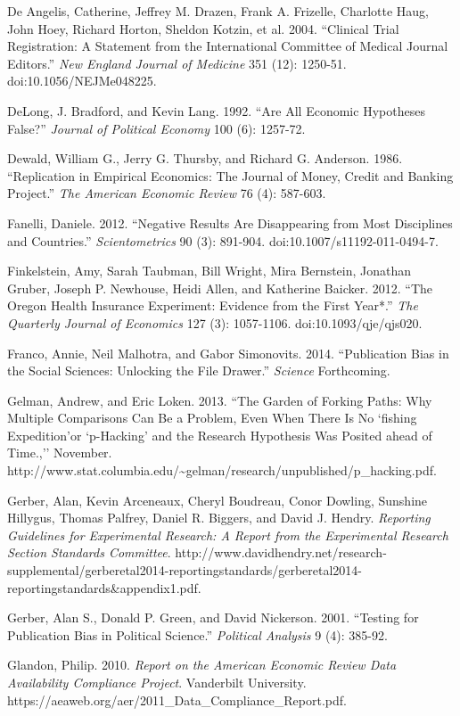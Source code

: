 \documentclass[12pt] {article}
\begin{document}
De Angelis, Catherine, Jeffrey M. Drazen, Frank A. Frizelle, Charlotte
Haug, John Hoey, Richard Horton, Sheldon Kotzin, et al. 2004. ``Clinical
Trial Registration: A Statement from the International Committee of
Medical Journal Editors.'' \emph{New England Journal of Medicine} 351
(12): 1250-51. doi:10.1056/NEJMe048225.

DeLong, J. Bradford, and Kevin Lang. 1992. ``Are All Economic Hypotheses
False?'' \emph{Journal of Political Economy} 100 (6): 1257-72.

Dewald, William G., Jerry G. Thursby, and Richard G. Anderson. 1986.
``Replication in Empirical Economics: The Journal of Money, Credit and
Banking Project.'' \emph{The American Economic Review} 76 (4): 587-603.

Fanelli, Daniele. 2012. ``Negative Results Are Disappearing from Most
Disciplines and Countries.'' \emph{Scientometrics} 90 (3): 891-904.
doi:10.1007/s11192-011-0494-7.

Finkelstein, Amy, Sarah Taubman, Bill Wright, Mira Bernstein, Jonathan
Gruber, Joseph P. Newhouse, Heidi Allen, and Katherine Baicker. 2012.
``The Oregon Health Insurance Experiment: Evidence from the First
Year*.'' \emph{The Quarterly Journal of Economics} 127 (3): 1057-1106.
doi:10.1093/qje/qjs020.

Franco, Annie, Neil Malhotra, and Gabor Simonovits. 2014. ``Publication
Bias in the Social Sciences: Unlocking the File Drawer.'' \emph{Science}
Forthcoming.

Gelman, Andrew, and Eric Loken. 2013. ``The Garden of Forking Paths: Why
Multiple Comparisons Can Be a Problem, Even When There Is No `fishing
Expedition'or `p-Hacking' and the Research Hypothesis Was Posited ahead
of Time.,'' November.
http://www.stat.columbia.edu/\textasciitilde{}gelman/research/unpublished/p\_hacking.pdf.

Gerber, Alan, Kevin Arceneaux, Cheryl Boudreau, Conor Dowling, Sunshine
Hillygus, Thomas Palfrey, Daniel R. Biggers, and David J. Hendry.
\emph{Reporting Guidelines for Experimental Research: A Report from the
Experimental Research Section Standards Committee}.
http://www.davidhendry.net/research-supplemental/gerberetal2014-reportingstandards/gerberetal2014-reportingstandards\&appendix1.pdf.

Gerber, Alan S., Donald P. Green, and David Nickerson. 2001. ``Testing
for Publication Bias in Political Science.'' \emph{Political Analysis} 9
(4): 385-92.

Glandon, Philip. 2010. \emph{Report on the American Economic Review Data
Availability Compliance Project}. Vanderbilt University.
https://aeaweb.org/aer/2011\_Data\_Compliance\_Report.pdf.
\end{document}
